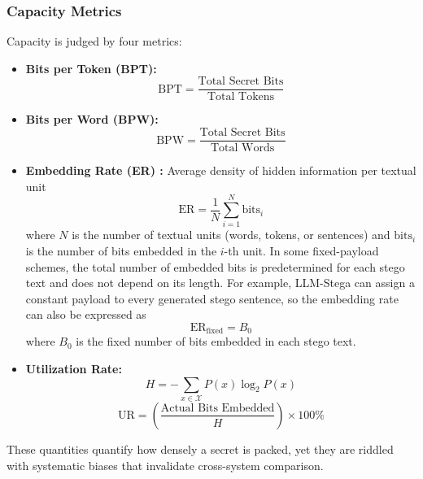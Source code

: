 \subsubsection{Capacity Metrics}

Capacity is judged by four metrics:

\begin{itemize}
  \item \textbf{Bits per Token (BPT):}
        \begin{equation}
          \text{BPT} = \frac{\text{Total Secret Bits}}{\text{Total Tokens}}
        \end{equation}
  \item \textbf{Bits per Word (BPW):}
        \begin{equation}
          \text{BPW} = \frac{\text{Total Secret Bits}}{\text{Total Words}}
        \end{equation}
  \item \textbf{Embedding Rate (ER) \cite{10.1007/3-540-49380-8_21}:} Average density of hidden information per textual unit
        \begin{equation}
          \text{ER} = \frac{1}{N} \sum_{i=1}^{N} \text{bits}_i
        \end{equation}
        where $N$ is the number of textual units (words, tokens, or sentences) and $\text{bits}_i$ is the number of bits embedded in the $i$-th unit.
        In some fixed-payload schemes, the total number of embedded bits is predetermined for each stego text and does not depend on its length. For example, LLM-Stega can assign a constant payload to every generated stego sentence, so the embedding rate can also be expressed as
        \begin{equation}
          \text{ER}_{\text{fixed}} = B_0
        \end{equation}
        where $B_0$ is the fixed number of bits embedded in each stego text.
  \item \textbf{Utilization Rate:}
        \begin{equation}
          H = -\sum_{x \in \mathcal{X}} P(x) \log_2 P(x)
        \end{equation}
        \begin{equation}
          \text{UR} = \left( \frac{\text{Actual Bits Embedded}}{H} \right) \times 100\%
        \end{equation}
\end{itemize}

These quantities quantify how densely a secret is packed, yet they are riddled with systematic biases that invalidate cross-system comparison.


